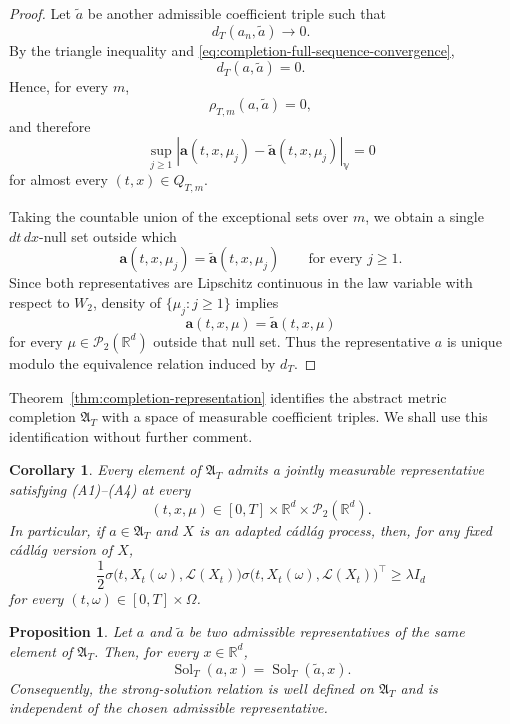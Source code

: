 \documentclass[12pt,oneside, reqno]{amsart}
\newtheorem{proposition}[theorem]{Proposition}
\newtheorem{corollary}[theorem]{Corollary}
\numberwithin{equation}{section}
\begin{document}
\begin{proof}
		Let \(\widetilde a\) be another admissible coefficient triple such
		that
		\[
		d_T(a_n,\widetilde a)
		\longrightarrow0.
		\]
		By the triangle inequality and
		\eqref{eq:completion-full-sequence-convergence},
		\[
		d_T(a,\widetilde a)=0.
		\]
		Hence, for every \(m\),
		\[
		\rho_{T,m}(a,\widetilde a)=0,
		\]
		and therefore
		\[
		\sup_{j\geq1}
		\left|
		\mathbf a(t,x,\mu_j)
		-
		\widetilde{\mathbf a}(t,x,\mu_j)
		\right|_{\mathbb V}
		=0
		\]
		for almost every \((t,x)\in Q_{T,m}\).
		
		Taking the countable union of the exceptional sets over \(m\), we
		obtain a single \(dt\,dx\)-null set outside which
		\[
		\mathbf a(t,x,\mu_j)
		=
		\widetilde{\mathbf a}(t,x,\mu_j)
		\qquad
		\text{for every }j\geq1.
		\]
		Since both representatives are Lipschitz continuous in the law
		variable with respect to \(W_2\), density of
		\(\{\mu_j:j\geq1\}\) implies
		\[
		\mathbf a(t,x,\mu)
		=
		\widetilde{\mathbf a}(t,x,\mu)
		\]
		for every
		\(\mu\in\mathcal P_2(\mathbb R^d)\) outside that null set.
		Thus the representative \(a\) is unique modulo the equivalence
		relation induced by \(d_T\).
	\end{proof}
	
	
	
	
	
	
	Theorem~\ref{thm:completion-representation} identifies the abstract
	metric completion $\mathfrak A_T$ with a space of measurable
	coefficient triples. We shall use this identification without
	further comment.
	
	
	
	\begin{corollary}
		\label{cor}
		Every element of $\mathfrak A_T$ admits a jointly measurable
		representative satisfying \textnormal{(A1)}--\textnormal{(A4)} at
		every
		\[
		(t,x,\mu)\in
		[0,T]\times\mathbb R^d\times\mathcal P_2(\mathbb R^d).
		\]
		In particular, if $a\in\mathfrak A_T$ and $X$ is an adapted
		c\'adl\'ag process, then, for any fixed  c\'adl\'ag version of $X$,
		\[
		\frac12
		\sigma\bigl(t,X_t(\omega),\mathcal L(X_t)\bigr)
		\sigma\bigl(t,X_t(\omega),\mathcal L(X_t)\bigr)^\top
		\geq
		\lambda I_d
		\]
		for every $(t,\omega)\in[0,T]\times\Omega$.
	\end{corollary}
	
	
	
	
	
	\begin{proposition}
		\label{prop:rep-equivalence}
		Let $a$ and $\widetilde a$ be two admissible representatives of the
		same element of $\mathfrak A_T$. Then, for every $x\in\mathbb R^d$,
		\[
		\operatorname{Sol}_T(a,x)
		=
		\operatorname{Sol}_T(\widetilde a,x).
		\]
		Consequently, the strong-solution relation is well defined on
		$\mathfrak A_T$ and is independent of the chosen admissible
		representative.
	\end{proposition}
	
\end{document}
